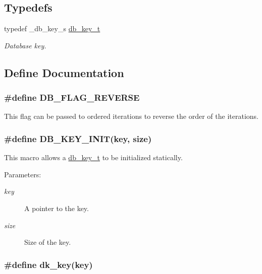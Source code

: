 \subsection*{Typedefs}
\begin{CompactItemize}
\item 
typedef \_\-db\_\-key\_\-s \hyperlink{group__dbprim_a0}{db\_\-key\_\-t}
\begin{CompactList}\small\item\em Database key.\item\end{CompactList}\end{CompactItemize}


\subsection{Define Documentation}
\hypertarget{group__dbprim_a4}{
\subsubsection[DB\_\-FLAG\_\-REVERSE]{\setlength{\rightskip}{0pt plus 5cm}\#define DB\_\-FLAG\_\-REVERSE}}
\label{group__dbprim_a4}


This flag can be passed to ordered iterations to reverse the order of the iterations. \hypertarget{group__dbprim_a1}{
\subsubsection[DB\_\-KEY\_\-INIT]{\setlength{\rightskip}{0pt plus 5cm}\#define DB\_\-KEY\_\-INIT(key, size)}}
\label{group__dbprim_a1}


This macro allows a \hyperlink{group__dbprim_a0}{db\_\-key\_\-t} to be initialized statically.\begin{Desc}
\item[Parameters: ]\par
\begin{description}
\item[{\em 
key}]A pointer to the key. \item[{\em 
size}]Size of the key. \end{description}
\end{Desc}
\hypertarget{group__dbprim_a2}{
\subsubsection[dk\_\-key]{\setlength{\rightskip}{0pt plus 5cm}\#define dk\_\-key(key)}}
\label{group__dbprim_a2}


